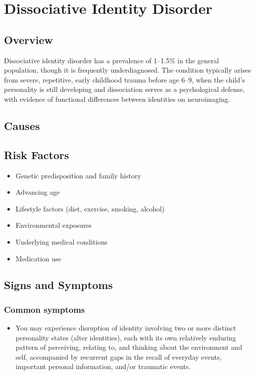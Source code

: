 \chapter{Dissociative Identity Disorder}
\label{sec:Dissociative Identity Disorder}

\section{Overview}
Dissociative identity disorder has a prevalence of 1--1.5\% in the general population, though it is frequently underdiagnosed. The condition typically arises from severe, repetitive, early childhood trauma before age 6--9, when the child's personality is still developing and dissociation serves as a psychological defense, with evidence of functional differences between identities on neuroimaging.
\section{Causes}
\section{Risk Factors}

\begin{itemize}[noitemsep]
  \item Genetic predisposition and family history
  \item Advancing age
  \item Lifestyle factors (diet, exercise, smoking, alcohol)
  \item Environmental exposures
  \item Underlying medical conditions
  \item Medication use
\end{itemize}
\section{Signs and Symptoms}

\subsection{Common symptoms}
\begin{itemize}[noitemsep]
  \item You may experience disruption of identity involving two or more distinct personality states (alter identities), each with its own relatively enduring pattern of perceiving, relating to, and thinking about the environment and self, accompanied by recurrent gaps in the recall of everyday events, important personal information, and/or traumatic events. 
  \end{itemize}

